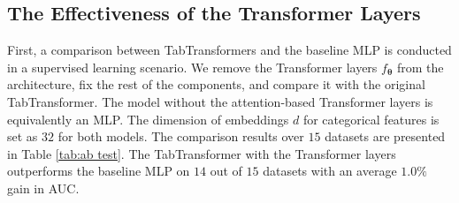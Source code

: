 \subsection{The Effectiveness of the Transformer Layers} \label{subsec: The Effectiveness}
First, a comparison between TabTransformers and the baseline MLP is conducted in a supervised learning scenario. We remove the Transformer layers $f_{\bm{\theta}}$ from the architecture, fix the rest of the components, and compare it with the original TabTransformer. The model without the attention-based Transformer layers is equivalently an MLP. The dimension of embeddings $d$ for categorical features is set as $32$ for both models. The comparison results over $15$ datasets are presented in Table \ref{tab:ab test}. The TabTransformer with the Transformer layers outperforms the baseline MLP on $14$ out of $15$ datasets with an average $1.0\%$ gain in AUC. %

\begin{table}
\caption{Comparison between TabTransfomers and the baseline MLP. The evaluation metric is AUC in percentage.}
\centering
\label{tab:ab test}
\setlength{\tabcolsep}{4pt}
\end{table}

